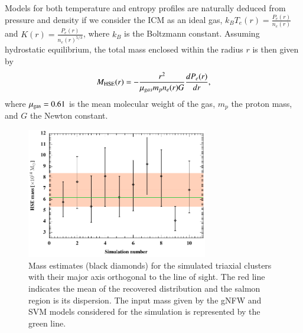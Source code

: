 \documentclass[traditabstract]{aa}
\begin{document}
\indent Models for both temperature and entropy profiles are naturally deduced from pressure and density if we consider the ICM as an ideal gas, $k_B T_e(r) = \frac{P_e(r)}{n_e(r)}$ and $K(r) =  \frac{P_e(r)}{n_e(r)^{5/3}}$, where $k_B$ is the Boltzmann constant. Assuming hydrostatic equilibrium, the total mass enclosed within the radius $r$ is then given by
\begin{equation}
M_{\rm HSE}(r) = -\frac{r^2}{\mu_{gas} m_p n_e(r) G} \frac{dP_e(r)}{dr},
\label{eq:hse_mass}
\end{equation}
where $\mu_{\rm{gas}} = 0.61$ is the mean molecular weight of the gas, $m_p$ the proton mass, and $G$ the Newton constant.
\begin{figure}[h]
\centering
\includegraphics[height=5.7cm]{mass_reconstruction_90deg.pdf}
\caption{{\footnotesize Mass estimates (black diamonds) for the simulated triaxial clusters with their major axis orthogonal to the line of sight. The red line indicates the mean of the recovered distribution and the salmon region is its dispersion. The input mass given by the gNFW and SVM models considered for the simulation is represented by the green line.}}
\label{fig:ellipticity_mass}
\end{figure}
\end{document}
